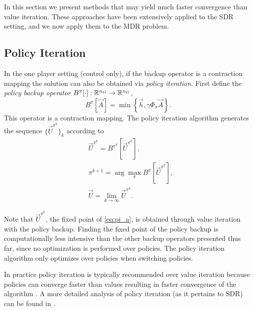 In this section we present methods that may yield much faster convergence than value iteration. These approaches have been extensively applied to the SDR setting, and we now apply them to the MDR problem. 

\subsection{Policy Iteration}

In the one player setting (control only), if the backup operator is a contraction mapping the solution can also be obtained via \emph{policy iteration}. First define the \emph{policy backup operator} $B^{\pi}[\cdot]: \mathbb{R}^{n_G} \rightarrow \mathbb{R}^{n_G}$, 
%
\begin{equation} \label{eq:backup_policy}
B^{\pi}[\vec{A}] = \min\left\{ \vec{h}, \gamma \Phi_{\pi} \vec{A} \right \} .
\end{equation}%
\noindent This operator is a contraction mapping. The policy iteration algorithm generates the sequence $\{\vec{U}^{\pi^k}\}_{k}$ according to
%
%
\begin{subequations}\label{eq:pi}
\begin{align}
&\vec{U}^{\pi^k} = B^{\pi^k}[\vec{U}^{\pi^k}] \label{eq:pi_a} ,\\
&\pi^{k+1} = \arg\underset{\pi}{\max}B^{\pi}[\vec{U}^{\pi^k}] ,\\ 
&\vec{U} = \lim_{k\rightarrow \infty} \vec{U}^{\pi^k}.
\end{align}
\end{subequations}

Note that ${\vec{U}^{\pi^k}}$, the fixed point of \eqref{eq:pi_a}, is obtained through value iteration with the policy backup. Finding the fixed point of the policy backup is computationally less intensive than the other backup operators presented thus far, since no optimization is performed over policies. The policy iteration algorithm only optimizes over policies when switching policies.  

In practice policy iteration is typically recommended over value iteration because policies can converge faster than values resulting in faster convergence of the algorithm \cite{Russell2003}. A more detailed analysis of policy iteration (as it pertains to SDR) can be found in \cite{Bokanowski2009,Howard1964, Puterman1979}. 

